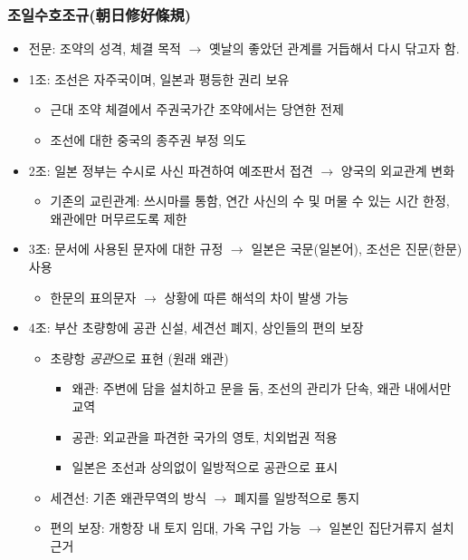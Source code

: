 \subsubsection*{조일수호조규(朝日修好條規)}

\begin{itemize}
    \item 전문: 조약의 성격, 체결 목적 $\rightarrow$ 옛날의 좋았던 관계를 거듭해서 다시 닦고자 함.
    \item 1조: 조선은 자주국이며, 일본과 평등한 권리 보유
    \begin{itemize}
        \item 근대 조약 체결에서 주권국가간 조약에서는 당연한 전제
        \item 조선에 대한 중국의 종주권 부정 의도
    \end{itemize}
    \item 2조: 일본 정부는 수시로 사신 파견하여 예조판서 접견 $\rightarrow$ 양국의 외교관계 변화
    \begin{itemize}
        \item 기존의 교린관계: 쓰시마를 통함, 연간 사신의 수 및 머물 수 있는 시간 한정, 왜관에만 머무르도록 제한
    \end{itemize}
    \item 3조: 문서에 사용된 문자에 대한 규정 $\rightarrow$ 일본은 국문(일본어), 조선은 진문(한문) 사용
    \begin{itemize}
        \item 한문의 표의문자 $\rightarrow$ 상황에 따른 해석의 차이 발생 가능
    \end{itemize}
    \item 4조: 부산 초량항에 공관 신설, 세견선 폐지, 상인들의 편의 보장
    \begin{itemize}
        \item 초량항 \emph{공관}으로 표현 (원래 왜관)
        \begin{itemize}
            \item 왜관: 주변에 담을 설치하고 문을 둠, 조선의 관리가 단속, 왜관 내에서만 교역
            \item 공관: 외교관을 파견한 국가의 영토, 치외법권 적용
            \item 일본은 조선과 상의없이 일방적으로 공관으로 표시
        \end{itemize}
        \item 세견선: 기존 왜관무역의 방식 $\rightarrow$ 폐지를 일방적으로 통지
        \item 편의 보장: 개항장 내 토지 임대, 가옥 구입 가능 $\rightarrow$ 일본인 집단거류지 설치 근거

\end{itemize}
\end{itemize}
